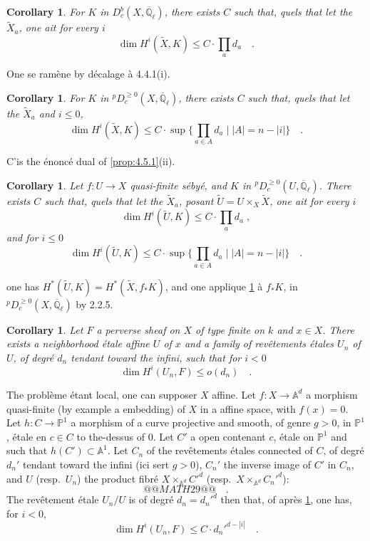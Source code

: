 \documentclass[12pt,a4paper]{article}
\theoremstyle{plain}
\newtheorem{corollary}[theorem]{Corollary}
\theoremstyle{definition}
\begin{document}
{{\begin{corollary}\label{cor:4.5.2}
For $K$ in $D_{c}^{b}(X,\overline{\mathbb{Q}}_{\ell})$, there exists $C$ such that, quels that let the $\tilde{X}_{a}$, one ait for every $i$
\[
\dim H^{i}(\tilde{X}, K) \leq C \cdot \prod_{a} d_{a}\quad.
\]
\end{corollary}
One se ram\`{e}ne by d\'{e}calage \`{a} 4.4.1(i).

\begin{corollary}\label{cor:4.5.3}
For $K$ in ${}^{p}D_{c}^{\geq 0}(X,\overline{\mathbb{Q}}_{\ell})$, there exists $C$ such that, quels that let the $\tilde{X}_{a}$ and $i \leq 0$,
\[
\dim H^{i}(\tilde{X}, K) \leq C \cdot \sup\{\prod_{a \in A} d_{a} \mid |A| = n-|i|\}\quad.
\]
\end{corollary}
C'is the \'{e}nonc\'{e} dual of \ref{prop:4.5.1}(ii).

\begin{corollary}\label{cor:4.5.4}
Let $f: U \to X$ quasi-finite s\'{e}by\'{e}, and $K$ in ${}^{p}D_{c}^{\geq 0}(U,\overline{\mathbb{Q}}_{\ell})$. There exists $C$ such that, quels that let the $\tilde{X}_{a}$, posant $\tilde{U} = U \times_{X} \tilde{X}$, one ait for every $i$
\[
\dim H^{i}(\tilde{U}, K) \leq C \cdot \prod_{a} d_{a}\;,
\]
and for $i \leq 0$
\[
\dim H^{i}(\tilde{U}, K) \leq C \cdot \sup\{\prod_{a \in A} d_{a} \mid |A| = n-|i|\}\quad.
\]
\end{corollary}
one has $H^{*}({\tilde{U}}, K) = H^{*}(\tilde{X}, f_{*}K)$, and one applique \ref{cor:4.5.3} \`{a} $f_{*}K$, in ${}^{p}D_{c}^{\geq 0}(X,\overline{\mathbb{Q}}_{\ell})$ by 2.2.5.

\begin{corollary}\label{cor:4.5.5}
Let $F$ a perverse sheaf on $X$ of type finite on $k$ and $x \in X$. There exists a neighborhood \'{e}tale affine $U$ of $x$ and a family of rev\^{e}tements \'{e}tales $U_{n}$ of $U$, of degr\'{e} $d_{n}$ tendant toward the infini, such that for $i < 0$
\[
\dim H^{i}(U_{n}, F) \leq o(d_{n})\quad.
\]
\end{corollary}

The probl\`{e}me \'{e}tant local, one can supposer $X$ affine. Let $f: X \to \mathbb{A}^{d}$ a morphism quasi-finite (by example a embedding) of $X$ in a affine space, with $f(x) = 0$. Let $h: C \to \mathbb{P}^{1}$ a morphism of a curve projective and smooth, of genre $g > 0$, in $\mathbb{P}^{1}$, \'{e}tale en $c \in C$ to the-dessus of $0$. Let $C'$ a open contenant $c$, \'{e}tale on $\mathbb{P}^{1}$ and such that $h(C') \subset \mathbb{A}^{1}$. Let $C_{n}$ of the rev\^{e}tements \'{e}tales connected of $C$, of degr\'{e} $d_{n}'$ tendant toward the infini (ici sert $g > 0$), $C_{n}'$ the inverse image of $C'$ in $C_{n}$, and $U$ (resp.\ $U_{n}$) the product fibr\'{e} $X \times_{\mathbb{A}^{d}} C'^{d}$ (resp.\ $X \times_{\mathbb{A}^{d}} C_{n}'^{d}$):
\[
@@MATH29@@
\quad.
\]
The rev\^{e}tement \'{e}tale $U_{n}/U$ is of degr\'{e} $d_{n} = d_{n}'^{d}$ then that, of apr\`{e}s \ref{cor:4.5.4}, one has, for $i < 0$,
\[
\dim H^{i}(U_{n}, F) \leq C \cdot d_{n}'^{d-|i|}\quad.
\]

}}
\end{document}
